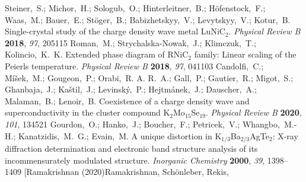 \documentclass[journal=cmatex,manuscript=article]{achemso}
\begin{document}
\begin{mcitethebibliography}{73}
	\EndOfBibitem
	Steiner,~S.; Michor,~H.; Sologub,~O.; Hinterleitner,~B.; H\"ofenstock,~F.;
	Waas,~M.; Bauer,~E.; St\"oger,~B.; Babizhetskyy,~V.; Levytskyy,~V.; Kotur,~B.
	Single-crystal study of the charge density wave metal {LuNiC}$_{2}$.
	\emph{Physical Review B} \textbf{2018}, \emph{97}, 205115\relax
	\mciteBstWouldAddEndPuncttrue
	\mciteSetBstMidEndSepPunct{\mcitedefaultmidpunct}
	{\mcitedefaultendpunct}{\mcitedefaultseppunct}\relax
	\EndOfBibitem
	Roman,~M.; Strychalska-Nowak,~J.; Klimczuk,~T.; Kolincio,~K.~K. Extended phase
	diagram of {RNiC}$_{2}$ family: Linear scaling of the {P}eierls temperature.
	\emph{Physical Review B} \textbf{2018}, \emph{97}, 041103\relax
	\mciteBstWouldAddEndPuncttrue
	\mciteSetBstMidEndSepPunct{\mcitedefaultmidpunct}
	{\mcitedefaultendpunct}{\mcitedefaultseppunct}\relax
	\EndOfBibitem
	Candolfi,~C.; M{\'{i}}{\v{s}}ek,~M.; Gougeon,~P.; Orabi,~R. A. R.~A.; Gall,~P.;
	Gautier,~R.; Migot,~S.; Ghanbaja,~J.; Ka{\v{s}}til,~J.; Levinsk{\'{y}},~P.;
	Hejtm{\'{a}}nek,~J.; Dauscher,~A.; Malaman,~B.; Lenoir,~B. Coexistence of a
	charge density wave and superconductivity in the cluster compound
	{K}$_{2}${Mo}$_{15}${Se}$_{19}$. \emph{Physical Review B} \textbf{2020},
	\emph{101}, 134521\relax
	\mciteBstWouldAddEndPuncttrue
	\mciteSetBstMidEndSepPunct{\mcitedefaultmidpunct}
	{\mcitedefaultendpunct}{\mcitedefaultseppunct}\relax
	\EndOfBibitem
	Gourdon,~O.; Hanko,~J.; Boucher,~F.; Petricek,~V.; Whangbo,~M.-H.;
	Kanatzidis,~M.~G.; Evain,~M. A unique distortion in
	{K}$_{1/3}${Ba}$_{2/3}${AgTe}$_2$: {X}-ray diffraction determination and
	electronic band structure analysis of its incommensurately modulated
	structure. \emph{Inorganic Chemistry} \textbf{2000}, \emph{39},
	1398--1409\relax
	\mciteBstWouldAddEndPuncttrue
	\mciteSetBstMidEndSepPunct{\mcitedefaultmidpunct}
	{\mcitedefaultendpunct}{\mcitedefaultseppunct}\relax
	\EndOfBibitem
	\bibitem[Ramakrishnan (2020)Ramakrishnan, Sch\"onleber, Rekis,

\end{mcitethebibliography}
\end{document}
